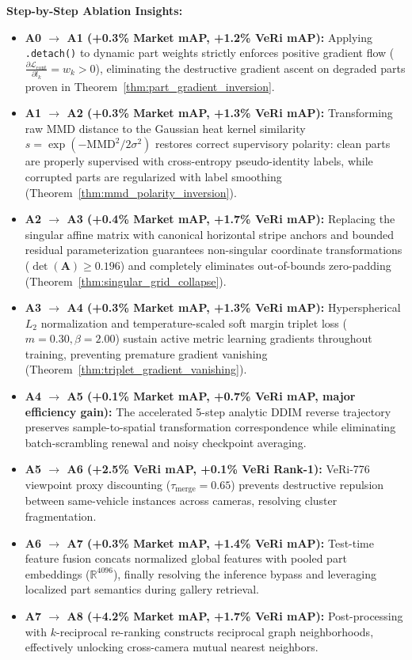\textbf{Step-by-Step Ablation Insights:}
\begin{itemize}
    \item \textbf{A0 $\to$ A1 (+0.3\% Market mAP, +1.2\% VeRi mAP):} Applying \texttt{.detach()} to dynamic part weights strictly enforces positive gradient flow ($\frac{\partial \mathcal{L}_{\text{cont}}}{\partial l_k} = w_k > 0$), eliminating the destructive gradient ascent on degraded parts proven in Theorem~\ref{thm:part_gradient_inversion}.
    \item \textbf{A1 $\to$ A2 (+0.3\% Market mAP, +1.3\% VeRi mAP):} Transforming raw MMD distance to the Gaussian heat kernel similarity $s = \exp(-\text{MMD}^2/2\sigma^2)$ restores correct supervisory polarity: clean parts are properly supervised with cross-entropy pseudo-identity labels, while corrupted parts are regularized with label smoothing (Theorem~\ref{thm:mmd_polarity_inversion}).
    \item \textbf{A2 $\to$ A3 (+0.4\% Market mAP, +1.7\% VeRi mAP):} Replacing the singular affine matrix with canonical horizontal stripe anchors and bounded residual parameterization guarantees non-singular coordinate transformations ($\det(\mathbf{A}) \ge 0.196$) and completely eliminates out-of-bounds zero-padding (Theorem~\ref{thm:singular_grid_collapse}).
    \item \textbf{A3 $\to$ A4 (+0.3\% Market mAP, +1.3\% VeRi mAP):} Hyperspherical $L_2$ normalization and temperature-scaled soft margin triplet loss ($m=0.30, \beta=2.00$) sustain active metric learning gradients throughout training, preventing premature gradient vanishing (Theorem~\ref{thm:triplet_gradient_vanishing}).
    \item \textbf{A4 $\to$ A5 (+0.1\% Market mAP, +0.7\% VeRi mAP, major efficiency gain):} The accelerated 5-step analytic DDIM reverse trajectory preserves sample-to-spatial transformation correspondence while eliminating batch-scrambling renewal and noisy checkpoint averaging.
    \item \textbf{A5 $\to$ A6 (+2.5\% VeRi mAP, +0.1\% VeRi Rank-1):} VeRi-776 viewpoint proxy discounting ($\tau_{\text{merge}}=0.65$) prevents destructive repulsion between same-vehicle instances across cameras, resolving cluster fragmentation.
    \item \textbf{A6 $\to$ A7 (+0.3\% Market mAP, +1.4\% VeRi mAP):} Test-time feature fusion concats normalized global features with pooled part embeddings ($\mathbb{R}^{4096}$), finally resolving the inference bypass and leveraging localized part semantics during gallery retrieval.
    \item \textbf{A7 $\to$ A8 (+4.2\% Market mAP, +1.7\% VeRi mAP):} Post-processing with $k$-reciprocal re-ranking constructs reciprocal graph neighborhoods, effectively unlocking cross-camera mutual nearest neighbors.
\end{itemize}

